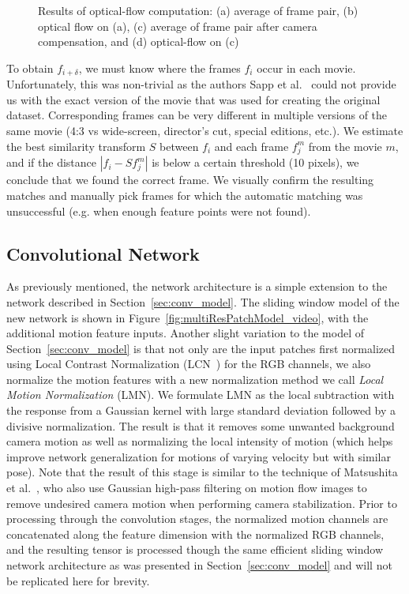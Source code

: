 \begin{figure}[ht]
\begin{subfigure}{0.23\textwidth}
                \caption{\footnotesize }
                \label{fig:w_flow}
        \end{subfigure}
        \caption{Results of optical-flow computation: (a) average of frame pair, (b) optical flow on (a), (c) average of frame pair after camera compensation, and (d) optical-flow on (c)}
        \label{fig:warpdemo}
\end{figure}

To obtain $f_{i+\delta}$, we must know where the frames $f_{i}$ occur in each movie. Unfortunately, this was non-trivial as the authors Sapp et al.~\cite{modec} could not provide us with the exact version of the movie that was used for creating the original dataset. Corresponding frames can be very different in multiple versions of the same movie (4:3 vs wide-screen, director's cut, special editions, etc.). We estimate the best similarity transform $S$ between $f_{i}$ and each frame $f^{m}_{j}$ from the movie $m$, and if the distance $|f_{i} - S f^{m}_{j}|$ is below a certain threshold (10 pixels), we conclude that we found the correct frame. We visually confirm the resulting matches and manually pick frames for which the automatic matching was unsuccessful (e.g. when enough feature points were not found).

\subsection{Convolutional Network}
\label{sec:conv_model_video}

As previously mentioned, the network architecture is a simple extension to the network described in Section~\ref{sec:conv_model}. The sliding window model of the new network is shown in Figure~\ref{fig:multiResPatchModel_video}, with the additional motion feature inputs. Another slight variation to the model of Section~\ref{sec:conv_model} is that not only are the input patches first normalized using Local Contrast Normalization (LCN~\cite{torch7}) for the RGB channels, we also normalize the motion features with a new normalization method we call \emph{Local Motion Normalization} (LMN). We formulate LMN as the local subtraction with the response from a Gaussian kernel with large standard deviation followed by a divisive normalization.  The result is that it removes some unwanted background camera motion as well as normalizing the local intensity of motion (which helps improve network generalization for motions of varying velocity but with similar pose). Note that the result of this stage is similar to the technique of Matsushita et al.~\cite{matsushita}, who also use Gaussian high-pass filtering on motion flow images to remove undesired camera motion when performing camera stabilization. Prior to processing through the convolution stages, the normalized motion channels are concatenated along the feature dimension with the normalized RGB channels, and the resulting tensor is processed though the same efficient sliding window network architecture as was presented in Section~\ref{sec:conv_model} and will not be replicated here for brevity.

